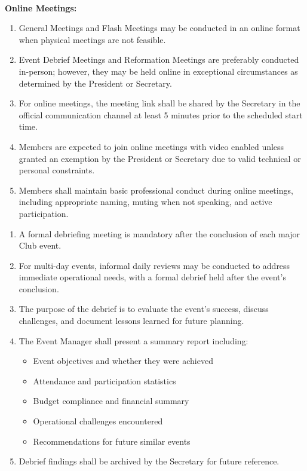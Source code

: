 \\
\textbf{Online Meetings:}
\begin{enumerate}[label=\alph*), leftmargin=2em, itemsep=0.3em]
    \item General Meetings and Flash Meetings may be conducted in an online format when physical meetings are not feasible.
    \item Event Debrief Meetings and Reformation Meetings are preferably conducted in-person; however, they may be held online in exceptional circumstances as determined by the President or Secretary.
    \item For online meetings, the meeting link shall be shared by the Secretary in the official communication channel at least 5 minutes prior to the scheduled start time.
    \item Members are expected to join online meetings with video enabled unless granted an exemption by the President or Secretary due to valid technical or personal constraints.
    \item Members shall maintain basic professional conduct during online meetings, including appropriate naming, muting when not speaking, and active participation.
\end{enumerate}



\begin{enumerate}[label=\alph*), leftmargin=2em, itemsep=0.3em]
    \item A formal debriefing meeting is mandatory after the conclusion of each major Club event.
    \item For multi-day events, informal daily reviews may be conducted to address immediate operational needs, with a formal debrief held after the event's conclusion.
    \item The purpose of the debrief is to evaluate the event's success, discuss challenges, and document lessons learned for future planning.
    \item The Event Manager shall present a summary report including:
    \begin{itemize}[leftmargin=1.5em, itemsep=0.2em]
        \item Event objectives and whether they were achieved
        \item Attendance and participation statistics
        \item Budget compliance and financial summary
        \item Operational challenges encountered
        \item Recommendations for future similar events
    \end{itemize}
    \item Debrief findings shall be archived by the Secretary for future reference.
\end{enumerate}

